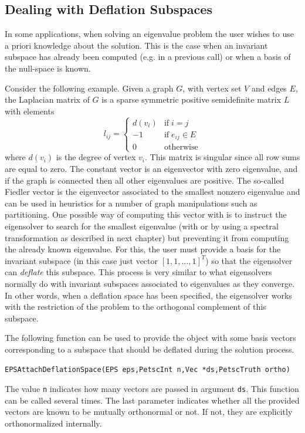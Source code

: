 \subsection{Dealing with Deflation Subspaces}

	In some applications, when solving an eigenvalue problem the user wishes to use a priori knowledge about the solution. This is the case when an invariant subspace has already been computed (e.g. in a previous  call) or when a basis of the null-space is known.

	Consider the following example. Given a graph $G$, with vertex set $V$ and edges $E$, the Laplacian matrix of $G$ is a sparse symmetric positive semidefinite matrix $L$ with elements
$$l_{ij}=\left\{\begin{array}{cl}
         d(v_i) & \mathrm{if}\;i=j\\
         -1 & \mathrm{if}\;e_{ij}\in E\\
         0&\mathrm{otherwise}
\end{array}\right.$$
where $d(v_i)$ is the degree of vertex $v_i$. This matrix is singular since all row sums are equal to zero. The constant vector is an eigenvector with zero eigenvalue, and if the graph is connected then all other eigenvalues are positive. The so-called Fiedler vector is the eigenvector associated to the smallest nonzero eigenvalue and can be used in heuristics for a number of graph manipulations such as partitioning. One possible way of computing this vector with \slepc is to instruct the eigensolver to search for the smallest eigenvalue (with  or by using a spectral transformation as described in next chapter) but preventing it from computing the already known eigenvalue. For this, the user must provide a basis for the invariant subspace (in this case just vector $[1,1,\ldots,1]^T$) so that the eigensolver can \emph{deflate} this subspace. This process is very similar to what eigensolvers normally do with invariant subspaces associated to eigenvalues as they converge. In other words, when a deflation space has been specified, the eigensolver works with the restriction of the problem to the orthogonal complement of this subspace.

	The following function can be used to provide the  object with some basis vectors corresponding to a subspace that should be deflated during the solution process. 
	\begin{Verbatim}[fontsize=\small]
	EPSAttachDeflationSpace(EPS eps,PetscInt n,Vec *ds,PetscTruth ortho)
	\end{Verbatim}
The value \texttt{n} indicates how many vectors are passed in argument \texttt{ds}. This function can be called several times. The last parameter indicates whether all the provided vectors are known to be mutually orthonormal or not. If not, they are explicitly orthonormalized internally.

